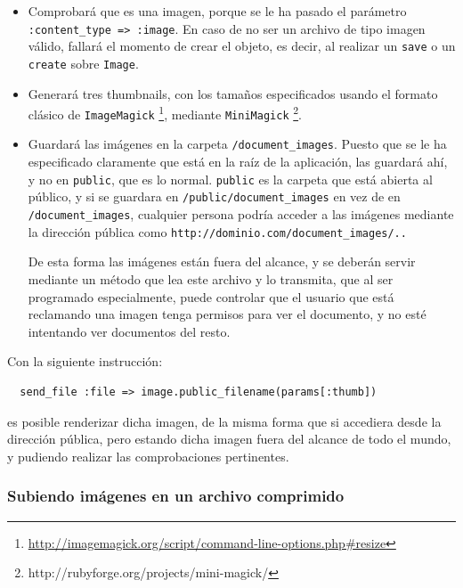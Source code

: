 \begin{itemize}
  \item Comprobará que es una imagen, porque se le ha pasado el parámetro \texttt{:content\_type => :image}. En caso de no ser un archivo de tipo imagen válido, fallará el momento de crear el objeto, es decir, al realizar un \texttt{save} o un \texttt{create} sobre \texttt{Image}.
  \item Generará tres thumbnails, con los tamaños especificados usando el formato clásico de \texttt{ImageMagick} \footnote{\url{http://imagemagick.org/script/command-line-options.php\#resize}}, mediante \texttt{MiniMagick} \footnote{http://rubyforge.org/projects/mini-magick/}.
  \item Guardará las imágenes en la carpeta \texttt{/document\_images}. Puesto que se le ha especificado claramente que está en la raíz de la aplicación, las guardará ahí, y no en \texttt{public}, que es lo normal. \texttt{public} es la carpeta que está abierta al público, y si se guardara en \texttt{/public/document\_images} en vez de en \texttt{/document\_images}, cualquier persona podría acceder a las imágenes mediante la dirección pública como \texttt{http://dominio.com/document\_images/..}
  
  De esta forma las imágenes están fuera del alcance, y se deberán servir mediante un método que lea este archivo y lo transmita, que al ser programado especialmente, puede controlar que el usuario que está reclamando una imagen tenga permisos para ver el documento, y no esté intentando ver documentos del resto.
\end{itemize}

Con la siguiente instrucción:

\begin{verbatim}
  send_file :file => image.public_filename(params[:thumb])
\end{verbatim}

es posible renderizar dicha imagen, de la misma forma que si accediera desde la dirección pública, pero estando dicha imagen fuera del alcance de todo el mundo, y pudiendo realizar las comprobaciones pertinentes.


\subsubsection{Subiendo imágenes en un archivo comprimido} %
\label{ssub:subiendo_imágenes_en_un_archivo_comprimido}

